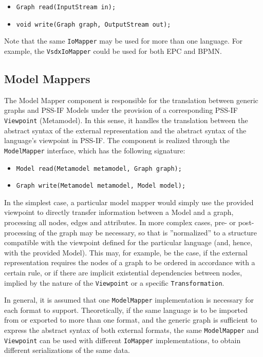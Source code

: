\begin{itemize}
\item \texttt{Graph read(InputStream in);}
\item \texttt{void write(Graph graph, OutputStream out);}
\end{itemize}

Note that the same \texttt{IoMapper} may be used for more than one language. For example, the \texttt{VsdxIoMapper} could be used for both EPC and BPMN.

\subsection{Model Mappers}
\label{sec:impl:comp:model}

The Model Mapper component is responsible for the translation between generic graphs and PSS-IF Models under the provision of a corresponding PSS-IF \texttt{Viewpoint} (Metamodel). In this sense, it handles the translation between the abstract syntax of the external representation and the abstract syntax of the language's viewpoint in PSS-IF. The component is realized through the \texttt{ModelMapper} interface, which has the following signature:

\begin{itemize}
\item \texttt{Model read(Metamodel metamodel, Graph graph);}
\item \texttt{Graph write(Metamodel metamodel, Model model);}
\end{itemize}

In the simplest case, a particular model mapper would simply use the provided viewpoint to directly transfer information between a Model and a graph, processing all nodes, edges and attributes. In more complex cases, pre- or post-processing of the graph may be necessary, so that is ''normalized'' to a structure compatible with the viewpoint defined for the particular language (and, hence, with the provided Model). This may, for example, be the case, if the external representation requires the nodes of a graph to be ordered in accordance with a certain rule, or if there are implicit existential dependencies between nodes, implied by the nature of the \texttt{Viewpoint} or a specific \texttt{Transformation}.

In general, it is assumed that one \texttt{ModelMapper} implementation is necessary for each format to support. Theoretically, if the same language is to be imported from or exported to more than one format, and the generic graph is sufficient to express the abstract syntax of both external formats, the same \texttt{ModelMapper} and \texttt{Viewpoint} can be used with different \texttt{IoMapper} implementations, to obtain different serializations of the same data.


